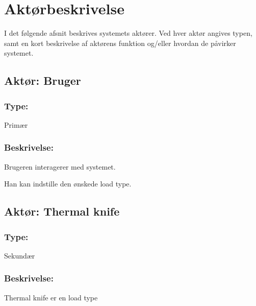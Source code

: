 

\section{Aktørbeskrivelse}
I det følgende afsnit beskrives systemets aktører. Ved hver aktør angives typen, samt en kort beskrivelse af aktørens funktion og/eller hvordan de påvirker systemet.

\begin{framed}
	\subsection{Aktør: Bruger}
	\subsubsection*{Type:}
		Primær
	
	\subsubsection*{Beskrivelse:}
		Brugeren interagerer med systemet.
		
		Han kan indstille den ønskede load type.
\end{framed}

\begin{framed}
	\subsection{Aktør: Thermal knife}
	\subsubsection*{Type:}
	Sekundær
	
	\subsubsection*{Beskrivelse:}
	Thermal knife er en load type
\end{framed}

